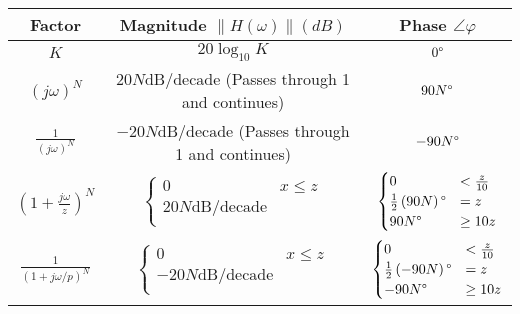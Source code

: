 	\vspace{-12mm}
	\begin{table}[!h]%
		\centering
		\renewcommand{\arraystretch}{2.35}
		\begin{tabular}{|c|c|c|} %
			\hline
			\textbf{Factor} & \textbf{Magnitude} $\lVert H\left( \omega \right) \rVert (dB)$ & \textbf{Phase} $ \angle \varphi$ \\ \hline
			$K$ & $20 \log_{10} K$ & $0 \degree$ \\ \hline
			$\left( j \omega \right)^{N}$ & $ 20N \text{dB/decade}$ (Passes through 1 and continues) & $90N \degree$ \\ \hline
			$\frac{1}{\left( j \omega \right)^{N}}$ & $-20N \text{dB/decade}$ (Passes through 1 and continues) & $-90N \degree$ \\ \hline
			
			$\left( 1 + \frac{j \omega}{z} \right)^{N}$ &
				$\begin{cases}
					0 & x \leq z \\
					20N \text{dB/decade} \\
				\end{cases}$ 
				&
				$\begin{cases}
					0 & < \frac{z}{10} \\
					\frac{1}{2} \left( 90N \right) \degree & =z \\
					90N \degree & \geq 10z \\
				\end{cases}$ 
				\\ \hline
				
				$\frac{1}{\left( 1 + j \omega / p \right)^{N}}$ & 
					$\begin{cases}
							0 & x \leq z \\
							-20N \text{dB/decade} \\
						\end{cases}$ 
					& 
					$\begin{cases}
						0 & < \frac{z}{10} \\
						\frac{1}{2} \left( -90N \right) \degree & =z \\
						-90N \degree & \geq 10z \\
					\end{cases}$ 
					\\ \hline
				

\end{tabular}
\end{table}
